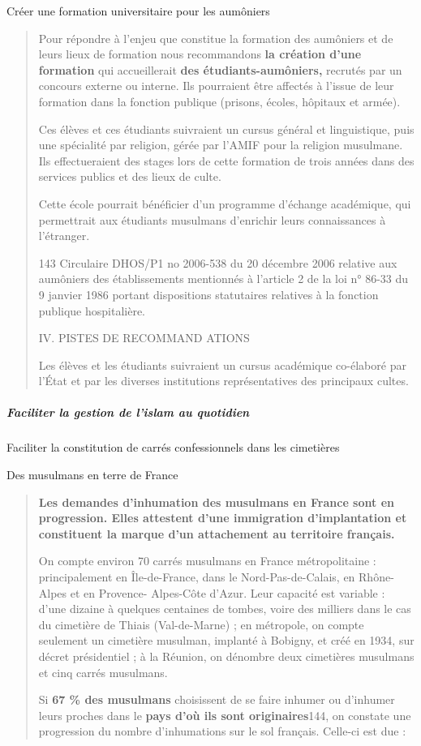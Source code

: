 Créer une formation universitaire pour les aumôniers

\begin{quote}
Pour répondre à l'enjeu que constitue la formation des aumôniers et de
leurs lieux de formation nous recommandons \textbf{la création d'une
formation} qui accueillerait \textbf{des étudiants-aumôniers,} recrutés
par un concours externe ou interne. Ils pourraient être affectés à
l'issue de leur formation dans la fonction publique (prisons, écoles,
hôpitaux et armée).

Ces élèves et ces étudiants suivraient un cursus général et
linguistique, puis une spécialité par religion, gérée par l'AMIF pour la
religion musulmane. Ils effectueraient des stages lors de cette
formation de trois années dans des services publics et des lieux de
culte.

Cette école pourrait bénéficier d'un programme d'échange académique, qui
permettrait aux étudiants musulmans d'enrichir leurs connaissances à
l'étranger.

143 Circulaire DHOS/P1 no 2006-538 du 20 décembre 2006 relative aux
aumôniers des établissements mentionnés à l'article 2 de la loi n° 86-33
du 9 janvier 1986 portant dispositions statutaires relatives à la
fonction publique hospitalière.

IV. PISTES DE RECOMMAND ATIONS

Les élèves et les étudiants suivraient un cursus académique co-élaboré
par l'État et par les diverses institutions représentatives des
principaux cultes.
\end{quote}

\hypertarget{faciliter-la-gestion-de-lislam-au-quotidien}{%
\subparagraph{Faciliter la gestion de l'islam au
quotidien}\label{faciliter-la-gestion-de-lislam-au-quotidien}}

Faciliter la constitution de carrés confessionnels dans les cimetières

Des musulmans en terre de France

\begin{quote}
\textbf{Les demandes d'inhumation des musulmans en France sont en
progression. Elles attestent d'une immigration d'implantation et
constituent la marque d'un attachement au territoire français.}

On compte environ 70 carrés musulmans en France métropolitaine :
principalement en Île-de-France, dans le Nord-Pas-de-Calais, en
Rhône-Alpes et en Provence- Alpes-Côte d'Azur. Leur capacité est
variable : d'une dizaine à quelques centaines de tombes, voire des
milliers dans le cas du cimetière de Thiais (Val-de-Marne) ; en
métropole, on compte seulement un cimetière musulman, implanté à
Bobigny, et créé en 1934, sur décret présidentiel ; à la Réunion, on
dénombre deux cimetières musulmans et cinq carrés musulmans.

Si \textbf{67 \% des musulmans} choisissent de se faire inhumer ou
d'inhumer leurs proches dans le \textbf{pays d'où ils sont
originaires}144, on constate une progression du nombre d'inhumations sur
le sol français. Celle-ci est due :
\end{quote}

